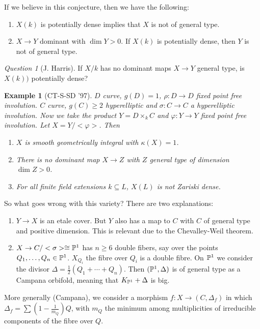 \documentclass[A4paper, british]{amsart}
\theoremstyle{darkgreentheorem}
\theoremstyle{darkbluedefinition}
\theoremstyle{darkredexample}
\newtheorem{exa}[thm]{Example}
\theoremstyle{remark}
\newtheorem{q}[thm]{Question}
\newcommand{\1}{\mathbbm{1}}
\newcommand{\sub}{\subseteq}
\begin{document}
If we believe in this conjecture, then we have the following:
\begin{enumerate}
    \item $X(k)$ is potentially dense implies that $X$ is not of general type.
    \item $X\to Y$ dominant with $\dim{Y}>0$.
	If $X(k)$ is potentially dense, then $Y$ is not of general type.
\end{enumerate}

\begin{q}[J. Harris]
    If $X/k$ has no dominant maps $X\to Y$ general type, is $X(k))$ potentially dense?
\end{q}

\begin{exa}[CT-S-SD '97]
    $D$ curve, $g(D)=1$, $\rho\colon D\to D$ fixed point free involution.
    $C$ curve, $g(C)\geqslant 2$ hyperelliptic and $\sigma\colon C\to C$ a hyperelliptic involution.
    Now we take the product $Y=D\times_{k} C$ and $\varphi\colon Y\to Y$ fixed point free involution.
    Let $X=Y/<\varphi >$.
    Then
    \begin{enumerate}
	\item $X$ is smooth geometrically integral with $\kappa(X)=1$.
	\item There is no dominant map $X\to Z$ with $Z$ general type of dimension $\dim{Z}>0$.
	\item For all finite field extensions $k\sub L$, $X(L)$ is not Zariski dense.
    \end{enumerate}
\end{exa}

So what goes wrong with this variety?
There are two explanations:
\begin{enumerate}
    \item $Y\to X$ is an etale cover.
	But $Y$ also has a map to $C$ with $C$ of general type and positive dimension.
	This is relevant due to the Chevalley-Weil theorem.
    \item $X\to C/<\sigma>\cong \P^{1}$ has $n\geqslant 6$ double fibers, say over the points $Q_{1},\ldots,Q_{n}\in \P^{1}$.
	$X_{Q_{i}}$ the fibre over $Q_{i}$ is a double fibre.
	On $\P^{1}$ we consider the divisor $\Delta=\frac{1}{2}(Q_{1}+\cdots +Q_{n})$.
	Then $(\P^{1},\Delta)$ is of general type as a Campana orbifold, meaning that $K_{\P^{1}}+\Delta$ is big.
\end{enumerate}

More generally (Campana), we consider a morphism $f\colon X\to (C,\Delta_{f})$ in which $\Delta_{f}=\sum(1-\frac{1}{m_{Q}})Q$, with $m_{Q}$ the minimum among multiplicities of irreducible components of the fibre over $Q$.
\end{document}
